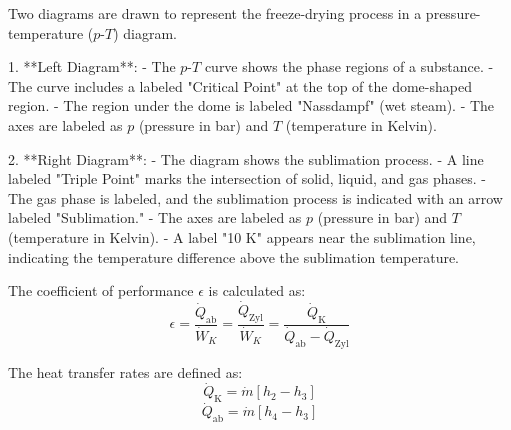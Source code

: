 Two diagrams are drawn to represent the freeze-drying process in a pressure-temperature (\(p\)-\(T\)) diagram.  

1. **Left Diagram**:  
   - The \(p\)-\(T\) curve shows the phase regions of a substance.  
   - The curve includes a labeled "Critical Point" at the top of the dome-shaped region.  
   - The region under the dome is labeled "Nassdampf" (wet steam).  
   - The axes are labeled as \(p\) (pressure in bar) and \(T\) (temperature in Kelvin).  

2. **Right Diagram**:  
   - The diagram shows the sublimation process.  
   - A line labeled "Triple Point" marks the intersection of solid, liquid, and gas phases.  
   - The gas phase is labeled, and the sublimation process is indicated with an arrow labeled "Sublimation."  
   - The axes are labeled as \(p\) (pressure in bar) and \(T\) (temperature in Kelvin).  
   - A label "10 K" appears near the sublimation line, indicating the temperature difference above the sublimation temperature.

The coefficient of performance \( \epsilon \) is calculated as:  
\[
\epsilon = \frac{\dot{Q}_{\text{ab}}}{\dot{W}_K} = \frac{\dot{Q}_{\text{Zyl}}}{\dot{W}_K} = \frac{\dot{Q}_{\text{K}}}{\dot{Q}_{\text{ab}} - \dot{Q}_{\text{Zyl}}}
\]  

The heat transfer rates are defined as:  
\[
\dot{Q}_{\text{K}} = \dot{m} \left[ h_2 - h_3 \right]
\]  
\[
\dot{Q}_{\text{ab}} = \dot{m} \left[ h_4 - h_3 \right]
\]